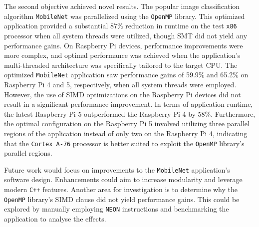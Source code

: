 The second objective achieved novel results. The popular image classification algorithm \texttt{MobileNet}\cite{mobilenet_paper}\cite{mobilenet_repo} was parallelized using the \texttt{OpenMP} library. This optimized application provided a substantial 87\% reduction in runtime on the test \texttt{x86} processor when all system threads were utilized, though SMT did not yield any performance gains. On Raspberry Pi devices, performance improvements were more complex, and optimal performance was achieved when the application's multi-threaded architecture was specifically tailored to the target CPU. The optimized \texttt{MobileNet} application saw performance gains of 59.9\% and 65.2\% on Raspberry Pi 4 and 5, respectively, when all system threads were employed. However, the use of SIMD optimizations on the Raspberry Pi devices did not result in a significant performance improvement. In terms of application runtime, the latest Raspberry Pi 5 outperformed the Raspberry Pi 4 by 58\%. Furthermore, the optimal configuration on the Raspberry Pi 5 involved utilizing three parallel regions of the application instead of only two on the Raspberry Pi 4, indicating that the \texttt{Cortex A-76} processor is better suited to exploit the \texttt{OpenMP} library's parallel regions.

Future work would focus on improvements to the \texttt{MobileNet} application’s software design. Enhancements could aim to increase modularity and leverage modern \texttt{C++} features. Another area for investigation is to determine why the \texttt{OpenMP} library's SIMD clause did not yield performance gains. This could be explored by manually employing \texttt{NEON} instructions and benchmarking the application to analyse the effects.


